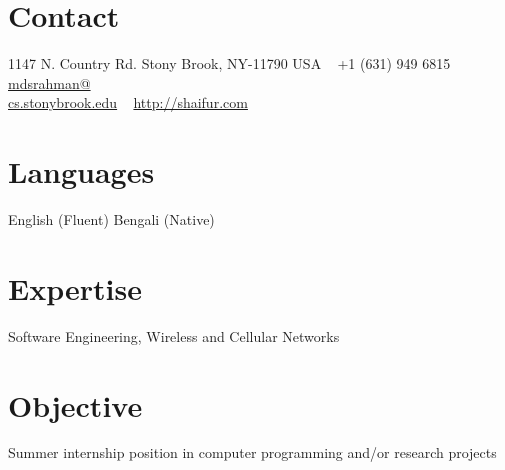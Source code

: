 \documentclass[]{friggeri-cv} %
\begin{document}
      
    
         
\begin{aside} %
\section{Contact}
1147 N. Country Rd.
Stony Brook, NY-11790
USA 
~
+1 (631) 949 6815
~
\href{mailto:mdsrahman@cs.stonybrook.edu}{mdsrahman@\\cs.stonybrook.edu}
~
\href{http://shaifur.com}{http://shaifur.com}
~
\section{Languages}
English (Fluent)
Bengali (Native)
~
\section{Expertise}
Software Engineering,
Wireless and Cellular Networks
\end{aside}

\section{Objective} 
Summer internship position in computer programming and/or research projects
\end{document}
